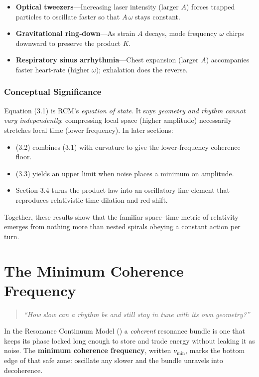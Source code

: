 \begin{itemize}
  \item \textbf{Optical tweezers}—Increasing laser intensity (larger \(A\)) forces trapped particles to oscillate faster so that \(A\,\omega\) stays constant.
  \item \textbf{Gravitational ring‐down}—As strain \(A\) decays, mode frequency \(\omega\) chirps downward to preserve the product \(K\).
  \item \textbf{Respiratory sinus arrhythmia}—Chest expansion (larger \(A\)) accompanies faster heart‐rate (higher \(\omega\)); exhalation does the reverse.
\end{itemize}

\medskip
\subsubsection{Conceptual Significance}

Equation (3.1) is RCM’s \emph{equation of state}.  It says \emph{geometry and rhythm cannot vary independently}: compressing local space (higher amplitude) necessarily stretches local time (lower frequency).  In later sections:
\begin{itemize}
  \item (3.2) combines (3.1) with curvature to give the lower‐frequency coherence floor.
  \item (3.3) yields an upper limit when noise places a minimum on amplitude.
  \item Section 3.4 turns the product law into an oscillatory line element that reproduces relativistic time dilation and red‐shift.
\end{itemize}

Together, these results show that the familiar space–time metric of relativity emerges from nothing more than nested spirals obeying a constant action per turn.

\section{The Minimum Coherence Frequency}
\begin{quotation}
\noindent\textit{“How slow can a rhythm be and still stay in tune with its own geometry?”}
\end{quotation}

In the Resonance Continuum Model (\RCM{}) a \emph{coherent} resonance bundle is one that keeps its phase locked long enough to store and trade energy without leaking it as noise.  
The \textbf{minimum coherence frequency}, written \(\nu_{\min}\), marks the bottom edge of that safe zone: oscillate any slower and the bundle unravels into decoherence.

